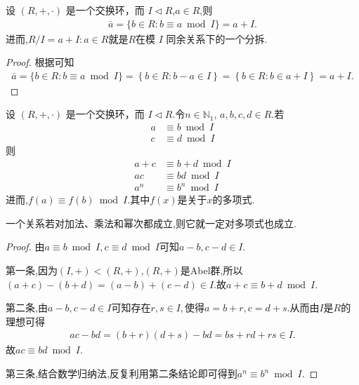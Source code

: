 \documentclass[../../main.tex]{subfiles}
\begin{document}
\begin{proposition}
设 $(R, +, \cdot)$ 是一个交换环，而 $I \lhd R$,$a\in R$,则
\begin{align*}
\bar{a}=\{b\in R:b\equiv a \bmod I\}=a+I.
\end{align*}
进而,$R/I={a+I:a\in R}$就是$R$在模 $I$ 同余关系下的一个分拆.
\end{proposition}
\begin{proof}
根据可知
\begin{align*}
\bar{a}=\{b\in R:b\equiv a \bmod I\}=\left\{ b\in R:b-a\in I \right\} =\left\{ b\in R:b\in a+I \right\} =a+I.
\end{align*}

\end{proof}


\begin{proposition}[模理想同余的基本性质]\label{proposition:模理想同余的基本性质}
设 $(R, +, \cdot)$ 是一个交换环，而 $I \lhd R$.令$n \in \mathbb{N}_1$, $a, b, c, d \in R$.若
\begin{align*}
a &\equiv b \bmod I\\
c &\equiv d \bmod I
\end{align*}
则
\begin{align*}
a + c &\equiv b + d \bmod I\\
ac &\equiv bd \bmod I\\
a^n &\equiv b^n \bmod I
\end{align*}
进而,$f(a)\equiv f(b) \bmod I.$其中$f(x)$是关于$x$的多项式.
\end{proposition}
\begin{remark}
一个关系若对加法、乘法和幂次都成立,则它就一定对多项式也成立.
\end{remark}
\begin{proof}
由$a \equiv b \bmod I,c \equiv d \bmod I$可知$a-b,c-d\in I.$

第一条,因为$(I,+)<(R,+)$,$(R,+)$是Abel群,所以$(a+c)-(b+d)=(a-b)+(c-d)\in I.$故$a + c \equiv b + d \bmod I.$

第二条,由$a-b,c-d\in I$可知存在$r,s\in I,$使得$a=b+r,c=d+s$.从而由$I$是$R$的理想可得
\begin{align*}
ac-bd=(b+r)(d+s)-bd=bs+rd+rs\in I.
\end{align*}
故$ac \equiv bd \bmod I.$

第三条,结合数学归纳法,反复利用第二条结论即可得到$a^n \equiv b^n \bmod I$.

\end{proof}
\end{document}
